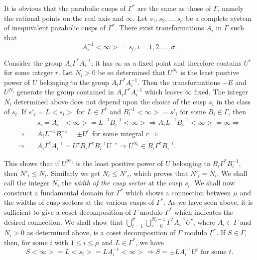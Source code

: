 It is obvious that the parabolic cusps of $\Gamma^{\ast}$ are the same
as those of $\Gamma$, namely the rational points on the real axis and
$\infty$. Let $s_1,s_2, \ldots, s_{\sigma}$ \pageoriginale be a
complete system of inequivalent parabolic cusps of
$\Gamma^{\ast}$. There exist transformations $A_i$ in $\Gamma$ such
that 
$$
A^{-1}_i <\infty>  = s_i, i=1,2, \ldots , \sigma.
$$

Consider the group $A_i \Gamma^{\ast} A^{-1}_i$; it has $\infty$ as a
fixed point and therefore contains $U^r$ for some integer $r$. 
Let $N_i>0$ be so determined that $U^{N_i}$ is the least positive
power of $U$ belonging to the group $A_i \Gamma^{\ast} A^{-1}_i$. Then
the transformations $-E$ and $U^{N_i}$ generate the group contained in
$A_i \Gamma^{\ast}A^{-1}_i$ which leaves $\infty$ fixed. The integer $N_i$
determined above does not depend upon the choice of the cusp $s_i$ in
the class of $s_i$. If $s'_i=L<s_i>$ for $L \in
\Gamma^{\ast}$ and $B^{-1}_i <\infty> = s'_i$ for some $B_i
\in \Gamma$, then 
\begin{align*}
 &s_i = A^{-1}_{i}<\infty>   = L^{-1} B^{-1}_i <\infty>
  \Longrightarrow
  A_i L^{-1} B^{-1}_i <\infty>  = \infty \Longrightarrow\\
 \Longrightarrow \quad &  A_i L^{-1} B^{-1}_i  = \pm U^r \text{ for some
   integral } r \Longrightarrow\\
\Longrightarrow  \quad  &  A_i \Gamma^{\ast} A^{-1}_i  = U^r B_i \Gamma^{\ast}
B^{-1}_i U^{-r} \Longrightarrow U^{N_i} \in B_i \Gamma^{\ast} B^{-1}_i.
\end{align*}

This shows that if $U^{N'_i}$ is the least positive power of $U$
belonging to $B_i \Gamma^{\ast} B^{-1}_i$, then $N'_i \leq
N_i$. Similarly we get $N_i \leq N'_i$, which proves that $N'_i =
N_i$. We shall call the integer $N_i$ the \textit{width of the cusp
  sector} at the cusp $s_i$. We shall now construct a fundamental
domain for $\Gamma^{\ast}$ which shows a connection between $\mu$ and
the widths of cusp sectors at the various cusps of $\Gamma^{\ast}$. As
we have seen above, it is sufficient to give a coset decomposition of
$\Gamma$ modulo $\Gamma^{\ast}$ which indicates the desired
connection. We shall show that $\bigcup\limits^{\sigma}_{i=1}
\bigcup\limits^{N_i-1}_{r=0}\Gamma^{\ast} A^{-1}_i U^r$, where $A_i
\in \Gamma$ and $N_i >0$ as determined above, is a coset
decomposition of $\Gamma$ modulo $\Gamma^{\ast}$. If $S \in
\Gamma$, then, \pageoriginale for some $i$ with $1\leq i \leq \mu$ and
$L \in \Gamma^{\ast}$, we have 
$$
S <\infty> = L<s_i> = L A^{-1}_i <\infty> \Longrightarrow S = \pm L
A^{-1}_i U^t \text{ for some } t.
$$ 


